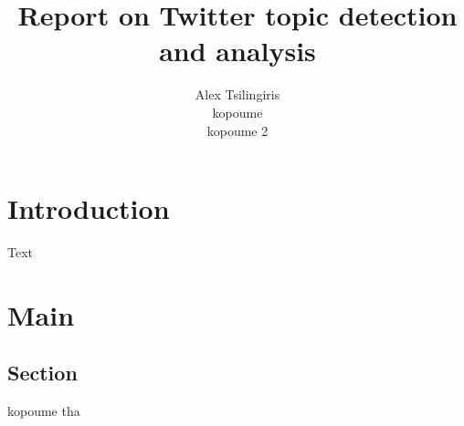 \documentclass[svgnames]{report}
\title{Report on Twitter topic detection and analysis}
\author{
Alex Tsilingiris \\
kopoume \\
kopoume 2\\
}
\begin{document}
\maketitle
\tableofcontents
\chapter{Introduction}
Text
\chapter{Main}
\section{Section}
kopoume tha



\nocite{*}
\end{document}
